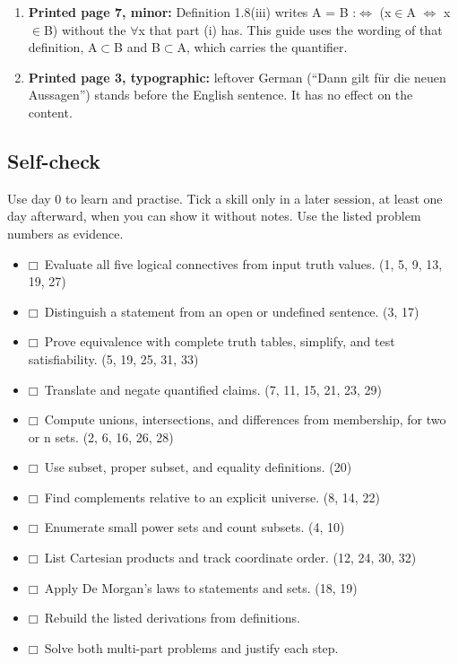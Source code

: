 \documentclass[11pt]{article}
\begin{document}
\begin{keepsection}
\begin{enumerate}
\item \textbf{Printed page 7, minor:} Definition 1.8(iii) writes A = B :\ensuremath{\Leftrightarrow} (x\ensuremath{\in}A \ensuremath{\Leftrightarrow} x\ensuremath{\in}B) without the \ensuremath{\forall}x that part (i) has. This guide uses the wording of that definition, A\ensuremath{\subset}B and B\ensuremath{\subset}A, which carries the quantifier.
\item \textbf{Printed page 3, typographic:} leftover German (“Dann gilt für die neuen Aussagen”) stands before the English sentence. It has no effect on the content.
\end{enumerate}
\end{keepsection}

\begin{keepsection}
\section{Self-check}

Use day 0 to learn and practise. Tick a skill only in a later session, at least one day afterward, when you can show it without notes. Use the listed problem numbers as evidence.

\begin{itemize}
\item $\mdlgwhtsquare$\ Evaluate all five logical connectives from input truth values. (1, 5, 9, 13, 19, 27)
\item $\mdlgwhtsquare$\ Distinguish a statement from an open or undefined sentence. (3, 17)
\item $\mdlgwhtsquare$\ Prove equivalence with complete truth tables, simplify, and test satisfiability. (5, 19, 25, 31, 33)
\item $\mdlgwhtsquare$\ Translate and negate quantified claims. (7, 11, 15, 21, 23, 29)
\item $\mdlgwhtsquare$\ Compute unions, intersections, and differences from membership, for two or n sets. (2, 6, 16, 26, 28)
\item $\mdlgwhtsquare$\ Use subset, proper subset, and equality definitions. (20)
\item $\mdlgwhtsquare$\ Find complements relative to an explicit universe. (8, 14, 22)
\item $\mdlgwhtsquare$\ Enumerate small power sets and count subsets. (4, 10)
\item $\mdlgwhtsquare$\ List Cartesian products and track coordinate order. (12, 24, 30, 32)
\item $\mdlgwhtsquare$\ Apply De Morgan’s laws to statements and sets. (18, 19)
\item $\mdlgwhtsquare$\ Rebuild the listed derivations from definitions.
\item $\mdlgwhtsquare$\ Solve both multi-part problems and justify each step.
\end{itemize}
\end{keepsection}
\end{document}
